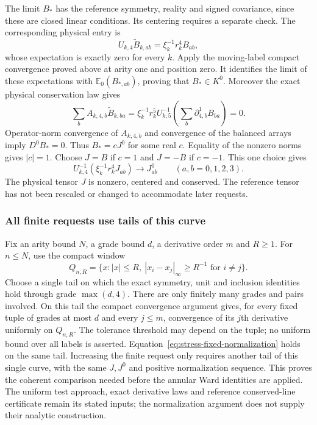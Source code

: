 The limit $B_*$ has the reference symmetry, reality and signed
covariance, since these are closed linear conditions. Its centering
requires a separate check. The corresponding physical entry is
\[
 U_{k,4}\widetilde B_{k,ab}=\xi_k^{-1}r_k^4B_{ab},
\]
whose expectation is exactly zero for every $k$. Apply the moving-label
compact convergence proved above at arity one and position zero.
It identifies the limit of these expectations with
$\mathbb E_0(B_{*,ab})$, proving that $B_*\in K^0$.
Moreover the exact physical conservation law gives
\[
 \sum_b A_{k,4,b}\widetilde B_{k,ba}
       =\xi_k^{-1}r_k^5 U_{k,5}^{-1}
                        \left(\sum_b\partial^1_{4,b}B_{ba}\right)=0.
\]
Operator-norm convergence of $A_{k,4,b}$ and convergence of the
balanced arrays imply $D^0B_*=0$. Thus $B_*=cJ^0$ for some real
$c$. Equality of the nonzero norms gives $|c|=1$.
Choose $J=B$ if $c=1$ and $J=-B$ if $c=-1$. This one choice gives
\begin{equation}\label{eq:stress-fixed-normalization}
 U_{k,4}^{-1}(\xi_k^{-1}r_k^4J_{ab})
                      \longrightarrow J^0_{ab}\qquad(a,b=0,1,2,3).
\end{equation}
The physical tensor $J$ is nonzero, centered and conserved. The
reference tensor has not been rescaled or changed to accommodate
later requests.

\subsubsection{All finite requests use tails of this curve}
Fix an arity bound $N$, a grade bound $d$, a derivative order $m$ and
$R\ge1$. For $n\le N$, use the compact window
\[
 Q_{n,R}=\{x:|x|\le R,\ |x_i-x_j|_\infty\ge R^{-1}
                                      \text{ for }i\ne j\}.
\]
Choose a single tail on which the exact symmetry, unit and inclusion
identities hold through grade $\max(d,4)$. There are only finitely
many grades and pairs involved. On this tail the compact convergence
argument gives, for every fixed tuple of grades at most $d$ and every
$j\le m$, convergence of its $j$th derivative uniformly on $Q_{n,R}$.
The tolerance threshold may depend on the tuple; no uniform bound over
all labels is asserted. Equation~\eqref{eq:stress-fixed-normalization}
holds on the same tail. Increasing the finite request only requires
another tail of this single curve, with the same $J,J^0$ and positive
normalization sequence. This proves the coherent comparison needed
before the annular Ward identities are applied. The uniform test
approach, exact derivative laws and reference conserved-line certificate
remain its stated inputs; the normalization argument does not supply
their analytic construction.
